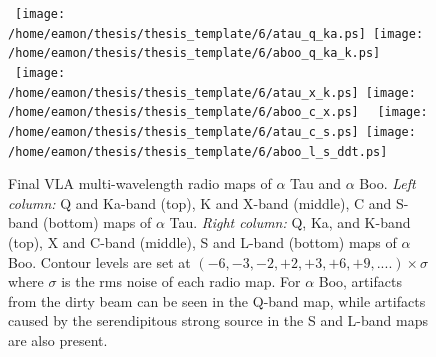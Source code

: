 \begin{figure}[htp]
\centering 
\mbox{
		  \texttt{[image: /home/eamon/thesis/thesis\_template/6/atau\_q\_ka.ps]}
          \texttt{[image: /home/eamon/thesis/thesis\_template/6/aboo\_q\_ka\_k.ps]}
          }
\mbox{
          \texttt{[image: /home/eamon/thesis/thesis\_template/6/atau\_x\_k.ps]}
          \texttt{[image: /home/eamon/thesis/thesis\_template/6/aboo\_c\_x.ps]}
          }
\mbox{
          \texttt{[image: /home/eamon/thesis/thesis\_template/6/atau\_c\_s.ps]}
          \texttt{[image: /home/eamon/thesis/thesis\_template/6/aboo\_l\_s\_ddt.ps]}
          }
\caption[Final VLA multi-wavelength radio maps of $\alpha$ Boo and $\alpha$ Tau]{Final VLA multi-wavelength radio maps of $\alpha$ Tau and $\alpha$ Boo. \textit{Left column:} Q and Ka-band (top), K and X-band (middle), C and S-band (bottom) maps of $\alpha$ Tau. \textit{Right column:} Q, Ka, and K-band (top), X and C-band (middle), S and L-band (bottom) maps of $\alpha$ Boo. Contour levels are set at $(-6,-3,-2,+2,+3,+6,+9,....)\times \sigma$ where $\sigma$ is the rms noise of each radio map. For $\alpha$ Boo, artifacts from the dirty beam can be seen in the Q-band map, while artifacts caused by the serendipitous strong source in the S and L-band maps are also present.}
\label{fig6.2}
\end{figure}

